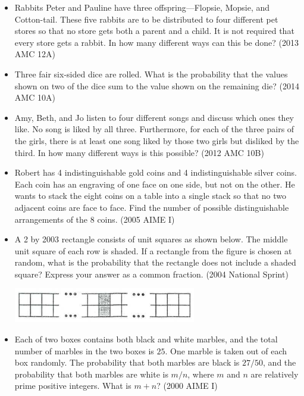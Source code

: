 \documentclass{article}
\begin{document}
\begin{itemize}
\item Rabbits Peter and Pauline have three offspring—Flopsie, Mopsie, and Cotton-tail. These five rabbits are to be distributed to four different pet stores so that no store gets both a parent and a child. It is not required that every store gets a rabbit. In how many different ways can this be done? (2013 AMC 12A)

\item Three fair six-sided dice are rolled. What is the probability that the values shown on two of the dice sum to the value shown on the remaining die? (2014 AMC 10A)

\item Amy, Beth, and Jo listen to four different songs and discuss which ones they like. No song is liked by all three. Furthermore, for each of the three pairs of the girls, there is at least one song liked by those two girls but disliked by the third. In how many different ways is this possible? (2012 AMC 10B)

\item Robert has 4 indistinguishable gold coins and 4 indistinguishable silver coins. Each coin has an engraving of one face on one side, but not on the other. He wants to stack the eight coins on a table into a single stack so that no two adjacent coins are face to face. Find the number of possible distinguishable arrangements of the 8 coins. (2005 AIME I)

\item A 2 by 2003 rectangle consists of unit squares as shown below. The middle unit square of each row is shaded. If a rectangle from the figure is chosen at random, what is the probability that the rectangle does not include a shaded square? Express your answer as a common fraction. (2004 National Sprint)

\centerline{\includegraphics{200430.png}}

\item Each of two boxes contains both black and white marbles, and the total number of marbles in the two boxes is $25$. One marble is taken out of each box randomly. The probability that both marbles are black is $27/50$, and the probability that both marbles are white is $m/n$, where $m$ and $n$ are relatively prime positive integers. What is $m+n$? (2000 AIME I)

\end{itemize}
\end{document}
